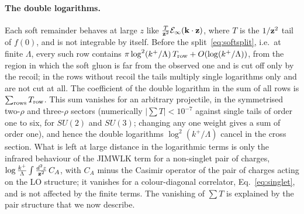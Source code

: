 \paragraph{The double logarithms.} Each soft remainder behaves at large $z$ like $\frac{T}{\mathbf{z}^2}\mathcal E_\infty(\mathbf{k}\cdot\mathbf{z})$, where $T$ is the $1/\mathbf{z}^2$ tail of $f(0)$, and is not integrable by itself. Before the split~\eqref{eq:softsplit}, i.e.\ at finite $\Lambda$, every such row contains $\pi\log^2(k^+/\Lambda)\,T_{\rm row}+O(\log(k^+/\Lambda))$, from the region in which the soft gluon is far from the observed one and is cut off only by the recoil; in the rows without recoil the tails multiply single logarithms only and are not cut at all. The coefficient of the double logarithm in the sum of all rows is $\sum_{\rm rows}T_{\rm row}$. This sum vanishes for an arbitrary projectile, in the symmetrised two-$\rho$ and three-$\rho$ sectors (numerically $|\sum T|<10^{-7}$ against single tails of order one to six, for $SU(2)$ and $SU(3)$; changing any one weight gives a sum of order one), and hence the double logarithms $\log^2(k^+/\Lambda)$ cancel in the cross section. What is left at large distance in the logarithmic terms is only the infrared behaviour of the JIMWLK term for a non-singlet pair of charges, $\log\frac{k^+}{\Lambda}\int\frac{d^2z}{\mathbf{z}^2}\,C_A$, with $C_A$ minus the Casimir operator of the pair of charges acting on the LO structure; it vanishes for a colour-diagonal correlator, Eq.~\eqref{eq:singlet}, and is not affected by the finite terms. The vanishing of $\sum T$ is explained by the pair structure that we now describe.

